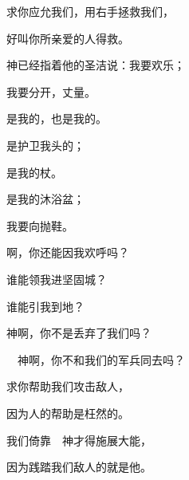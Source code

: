 {\Q {}求你应允我们，用右手拯救我们，
\par }{\Q 好叫你所亲爱的人得救。
\par }{\BB \par }{\Q {}神已经指着他的圣洁说：我要欢乐；
\par }{\Q 我要分开{}，丈量{}。
\par }{\Q {}是我的，{}也是我的。
\par }{是护卫我头的；
\par }{是我的杖。
\par }{\Q {}是我的沐浴盆；
\par }{\Q 我要向{}抛鞋。
\par }{啊，你还能因我欢呼吗？
\par }{\BB \par }{\Q {}谁能领我进坚固城？
\par }{\Q 谁能引我到{}地？
\par }{\Q {}神啊，你不是丢弃了我们吗？
\par }{\Q 　神啊，你不和我们的军兵同去吗？
\par }{\Q {}求你帮助我们攻击敌人，
\par }{\Q 因为人的帮助是枉然的。
\par }{\Q {}我们倚靠　神才得施展大能，
\par }{\Q 因为践踏我们敌人的就是他。

\par }
